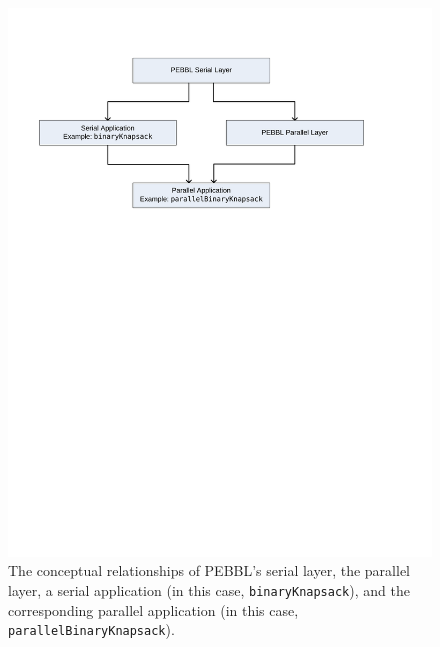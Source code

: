 \begin{figure}[tpb]
\begin{center}
\includegraphics[width=\textwidth]{layers}
\vspace{-0.4in}
\end{center}
\caption{The conceptual relationships of PEBBL's serial layer, the
parallel layer, a serial application (in this case,
\texttt{binaryKnapsack}), and the corresponding parallel application
(in this case, \texttt{parallelBinaryKnapsack}).
\label{fig:layers}
}
\end{figure}




